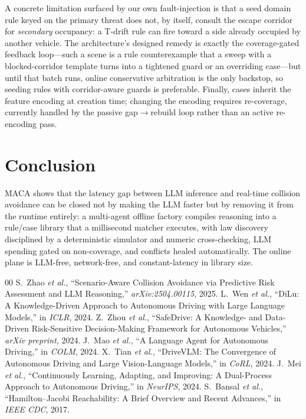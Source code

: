 \documentclass[conference]{IEEEtran}
\begin{document}
A concrete limitation surfaced by our own fault-injection is that a seed
domain rule keyed on the primary threat does not, by itself, consult the
escape corridor for \emph{secondary} occupancy: a T-drift rule can fire toward
a side already occupied by another vehicle. The architecture's designed remedy
is exactly the coverage-gated feedback loop---such a scene is a rule
counterexample that a sweep with a blocked-corridor template turns into a
tightened guard or an overriding case---but until that batch runs, online
conservative arbitration is the only backstop, so seeding rules with
corridor-aware guards is preferable. Finally, cases inherit the feature
encoding at creation time; changing the encoding requires re-coverage,
currently handled by the passive gap$\to$rebuild loop rather than an active
re-encoding pass.

\section{Conclusion}

MACA shows that the latency gap between LLM inference and real-time collision
avoidance can be closed not by making the LLM faster but by removing it from
the runtime entirely: a multi-agent offline factory compiles reasoning into a
rule/case library that a millisecond matcher executes, with law discovery
disciplined by a deterministic simulator and numeric cross-checking, LLM
spending gated on non-coverage, and conflicts healed automatically. The
online plane is LLM-free, network-free, and constant-latency in library size.

\begin{thebibliography}{00}
 S.~Zhao \emph{et al.}, ``Scenario-Aware Collision Avoidance
via Predictive Risk Assessment and LLM Reasoning,'' \emph{arXiv:2504.00115},
2025.
 L.~Wen \emph{et al.}, ``DiLu: A Knowledge-Driven Approach to
Autonomous Driving with Large Language Models,'' in \emph{ICLR}, 2024.
 Z.~Zhou \emph{et al.}, ``SafeDrive: A Knowledge- and
Data-Driven Risk-Sensitive Decision-Making Framework for Autonomous
Vehicles,'' \emph{arXiv preprint}, 2024.
 J.~Mao \emph{et al.}, ``A Language Agent for Autonomous
Driving,'' in \emph{COLM}, 2024.
 X.~Tian \emph{et al.}, ``DriveVLM: The Convergence of
Autonomous Driving and Large Vision-Language Models,'' in \emph{CoRL}, 2024.
 J.~Mei \emph{et al.}, ``Continuously Learning, Adapting, and
Improving: A Dual-Process Approach to Autonomous Driving,'' in
\emph{NeurIPS}, 2024.
 S.~Bansal \emph{et al.}, ``Hamilton--Jacobi Reachability: A Brief
Overview and Recent Advances,'' in \emph{IEEE CDC}, 2017.
\end{thebibliography}
\end{document}
